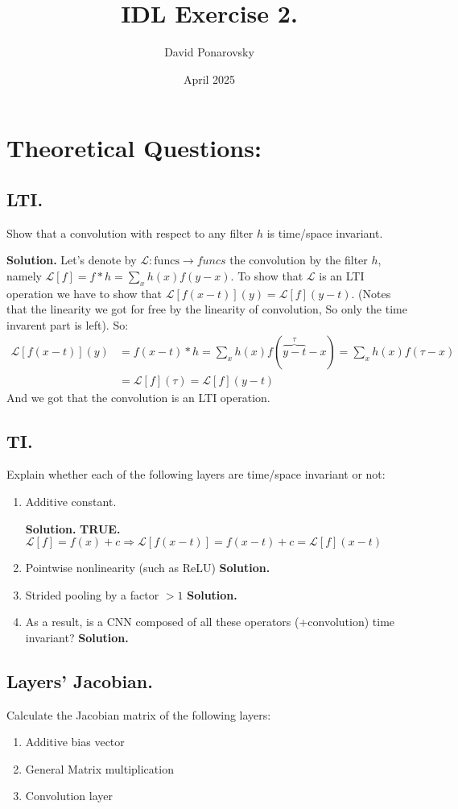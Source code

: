 \documentclass{article}
\title{IDL Exercise 2.}
\author{David Ponarovsky}
\date{April 2025}
\begin{document}
\maketitle

\section{Theoretical Questions:}

\subsection{LTI.} Show that a convolution with respect to any filter $h$ is time/space invariant.


\textbf{Solution.} Let's denote by $\mathcal{L} : \text{funcs} \rightarrow {funcs}$ the convolution by the filter $h$, namely $\mathcal{L}[f] = f*h = \sum_{x}{h(x)f(y-x)}$. To show that $\mathcal{L}$ is an LTI operation we have to show that $\mathcal{L}[f(x-t)](y) = \mathcal{L}[f](y-t)$. (Notes that the linearity we got for free by the linearity of convolution, So only the time invarent part is left). So: 
\begin{equation*}
    \begin{split}
      \mathcal{L}[f(x-t)](y) &=  f(x-t)*h = \sum_{x}{h(x)f( \overbrace{y-t}^{\tau}-x)} = \sum_{x}{h(x)f(\tau-x)}\\
      &= \mathcal{L}[f](\tau) = \mathcal{L}[f](y-t)
    \end{split}
\end{equation*}
And we got that the convolution is an LTI operation.
 
\subsection{TI.} Explain whether each of the following layers are time/space invariant or not:
\begin{enumerate}
  \item Additive constant.

    \textbf{Solution.} \textbf{TRUE.} $\mathcal{L}[f] = f(x) + c \Rightarrow  \mathcal{L}[f(x-t)] = f(x-t) + c =  \mathcal{L}[f](x-t)$
  \item Pointwise nonlinearity (such as ReLU)
\textbf{Solution.}
  \item Strided pooling by a factor $ > 1 $
\textbf{Solution.}
  \item As a result, is a CNN composed of all these operators (+convolution) time invariant?
\textbf{Solution.}
\end{enumerate}

\subsection{Layers’ Jacobian.} Calculate the Jacobian matrix of the following layers:
\begin{enumerate}
  \item Additive bias vector
  \item General Matrix multiplication
  \item Convolution layer
\end{enumerate}
\end{document}
